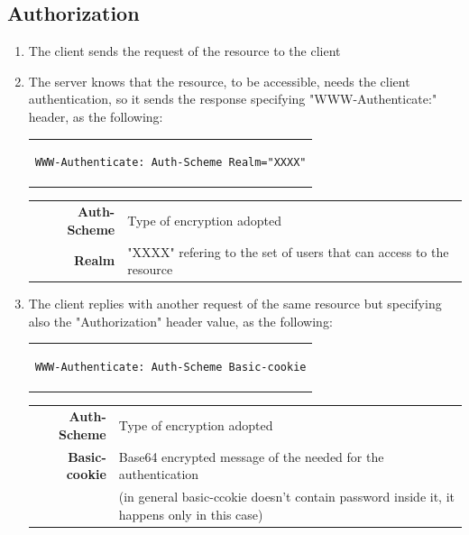 \subsection{Authorization}
\begin{enumerate}
\item{The client sends the request of the resource to the client}
\item{The server knows that the resource, to be accessible, needs the client authentication, so it sends the response specifying "WWW-Authenticate:" header, as the following:
\begin{center}
\begin{tabular}{c}
\begin{lstlisting}[linewidth=220pt, basicstyle=\footnotesize\sffamily,]
WWW-Authenticate: Auth-Scheme Realm="XXXX"
\end{lstlisting}
\end{tabular}
\end{center}
\begin{table}[h]
\centering
\footnotesize
\begin{tabular}{rl}
\textbf{Auth-Scheme}& {Type of encryption adopted}\\
\textbf{Realm}& {"XXXX" refering to the set of users that can access to the resource}\\
\end{tabular}
\end{table}
}
\item{The client replies with another request of the same resource but specifying also the "Authorization" header value, as the following:
\begin{center}
\begin{tabular}{c}
\begin{lstlisting}[linewidth=220pt, basicstyle=\footnotesize\sffamily,]
WWW-Authenticate: Auth-Scheme Basic-cookie
\end{lstlisting}
\end{tabular}
\end{center}
\begin{table}[h]
\centering
\footnotesize
\begin{tabular}{rl}
\textbf{Auth-Scheme}& {Type of encryption adopted}\\
\textbf{Basic-cookie}& {Base64 encrypted message of the needed for the authentication}\\
{}&{(in general basic-ccokie doesn't contain password inside it, it happens only in this case)}
\end{tabular}
\end{table}
}
\end{enumerate}
